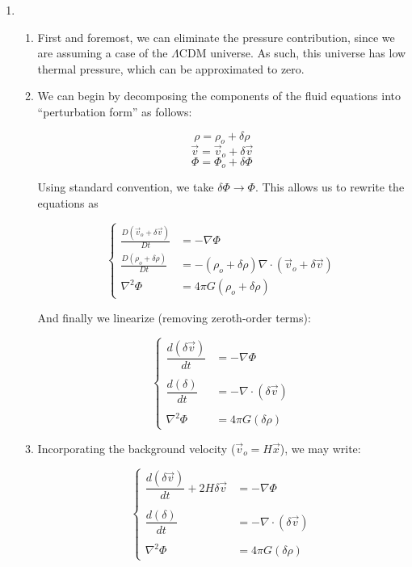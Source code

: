 \begin{enumerate}

  \item

    \begin{enumerate}

      \item First and foremost, we can eliminate the pressure contribution, since we are assuming a case of the $\Lambda$CDM universe. As such, this universe has low thermal pressure, which can be approximated to zero.

      \item We can begin by decomposing the components of the fluid equations into ``perturbation form'' as follows:

        $$\rho=\rho_o+\delta \rho$$
        $$\vec{v}=\vec{v}_o+\delta \vec{v}$$
        $$\Phi=\Phi_o+\delta \Phi$$

        Using standard convention, we take $\delta \Phi\to\Phi$. This allows us to rewrite the equations as

        $$\left\{\begin{array}{ll} \frac{D(\vec{v}_o+\delta\vec{v})}{Dt}&=-\nabla\Phi\\ \frac{D(\rho_o+\delta \rho)}{Dt} &= -(\rho_o+\delta \rho)\nabla\cdot(\vec{v}_o+\delta\vec{v})\\ \nabla^2\Phi&=4\pi G(\rho_o+\delta \rho) \end{array}$$

          And finally we linearize (removing zeroth-order terms):

        $$\boxed{\left\{\begin{array}{ll} \dfrac{d(\delta\vec{v})}{dt}&=-\nabla\Phi\\\\ \dfrac{d(\delta)}{dt} &= -\nabla\cdot(\delta\vec{v})\\\\ \nabla^2\Phi&=4\pi G(\delta \rho) \end{array}}$$

        \item Incorporating the background velocity ($\vec{v}_o=H\vec{x}$), we may write:

          $$\boxed{\left\{\begin{array}{ll} \dfrac{d(\delta\vec{v})}{dt}+2H\delta\vec{v}&=-\nabla\Phi\\\\ \dfrac{d(\delta)}{dt} &= -\nabla\cdot(\delta\vec{v})\\\\ \nabla^2\Phi&=4\pi G(\delta \rho) \end{array}}$$


\end{enumerate}
\end{enumerate}
